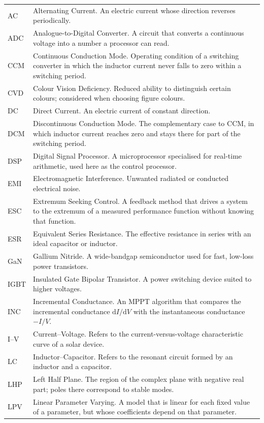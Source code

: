 \begin{longtable}{@{}L{0.16\textwidth}L{0.80\textwidth}@{}}
AC & Alternating Current. An electric current whose direction reverses periodically. \\
ADC & Analogue-to-Digital Converter. A circuit that converts a continuous voltage into a number a processor can read. \\
CCM & Continuous Conduction Mode. Operating condition of a switching converter in which the inductor current never falls to zero within a switching period. \\
CVD & Colour Vision Deficiency. Reduced ability to distinguish certain colours; considered when choosing figure colours. \\
DC & Direct Current. An electric current of constant direction. \\
DCM & Discontinuous Conduction Mode. The complementary case to CCM, in which inductor current reaches zero and stays there for part of the switching period. \\
DSP & Digital Signal Processor. A microprocessor specialised for real-time arithmetic, used here as the control processor. \\
EMI & Electromagnetic Interference. Unwanted radiated or conducted electrical noise. \\
ESC & Extremum Seeking Control. A feedback method that drives a system to the extremum of a measured performance function without knowing that function. \\
ESR & Equivalent Series Resistance. The effective resistance in series with an ideal capacitor or inductor. \\
GaN & Gallium Nitride. A wide-bandgap semiconductor used for fast, low-loss power transistors. \\
IGBT & Insulated Gate Bipolar Transistor. A power switching device suited to higher voltages. \\
INC & Incremental Conductance. An MPPT algorithm that compares the incremental conductance $\mathrm{d}I/\mathrm{d}V$ with the instantaneous conductance $-I/V$. \\
I--V & Current--Voltage. Refers to the current-versus-voltage characteristic curve of a solar device. \\
LC & Inductor--Capacitor. Refers to the resonant circuit formed by an inductor and a capacitor. \\
LHP & Left Half Plane. The region of the complex plane with negative real part; poles there correspond to stable modes. \\
LPV & Linear Parameter Varying. A model that is linear for each fixed value of a parameter, but whose coefficients depend on that parameter. \\

\end{longtable}
